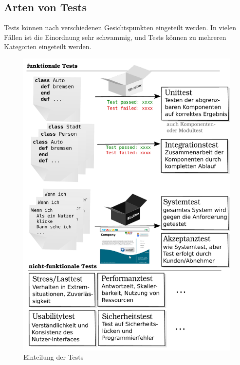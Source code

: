 
\subsection{Arten von Tests}
Tests können nach verschiedenen Gesichtspunkten eingeteilt werden. In vielen Fällen ist die Einordnung sehr schwammig, und Tests können zu mehreren Kategorien eingeteilt werden.
\begin{figure}[hp]
 \centering
 \includegraphics[width=\textwidth]{./diagrams/testarten.pdf}
 \caption{Einteilung der Tests}
 \label{fig:testArten}
\end{figure}

